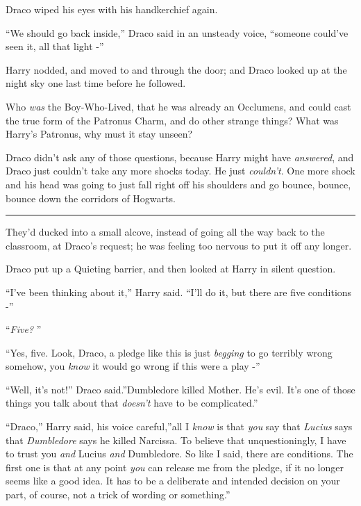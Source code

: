 Draco wiped his eyes with his handkerchief again.

``We should go back inside,'' Draco said in an unsteady voice, ``someone
could've seen it, all that light -''

Harry nodded, and moved to and through the door; and Draco looked up at
the night sky one last time before he followed.

Who \emph{was} the Boy-Who-Lived, that he was already an Occlumens, and
could cast the true form of the Patronus Charm, and do other strange
things? What was Harry's Patronus, why must it stay unseen?

Draco didn't ask any of those questions, because Harry might have
\emph{answered}, and Draco just couldn't take any more shocks today. He
just \emph{couldn't}. One more shock and his head was going to just fall
right off his shoulders and go bounce, bounce, bounce down the corridors
of Hogwarts.

\begin{center}\rule{3in}{0.4pt}\end{center}

They'd ducked into a small alcove, instead of going all the way back to
the classroom, at Draco's request; he was feeling too nervous to put it
off any longer.

Draco put up a Quieting barrier, and then looked at Harry in silent
question.

``I've been thinking about it,'' Harry said. ``I'll do it, but there are
five conditions -''

``\emph{Five?} ''

``Yes, five. Look, Draco, a pledge like this is just \emph{begging} to go
terribly wrong somehow, you \emph{know} it would go wrong if this were a
play -''

``Well, it's not!'' Draco said.''Dumbledore killed Mother. He's evil.
It's one of those things you talk about that \emph{doesn't} have to be
complicated.''

``Draco,'' Harry said, his voice careful,''all I \emph{know} is that
\emph{you} say that \emph{Lucius} says that \emph{Dumbledore} says he
killed Narcissa. To believe that unquestioningly, I have to trust you
\emph{and} Lucius \emph{and} Dumbledore. So like I said, there are
conditions. The first one is that at any point \emph{you} can release me
from the pledge, if it no longer seems like a good idea. It has to be a
deliberate and intended decision on your part, of course, not a trick of
wording or something.''

